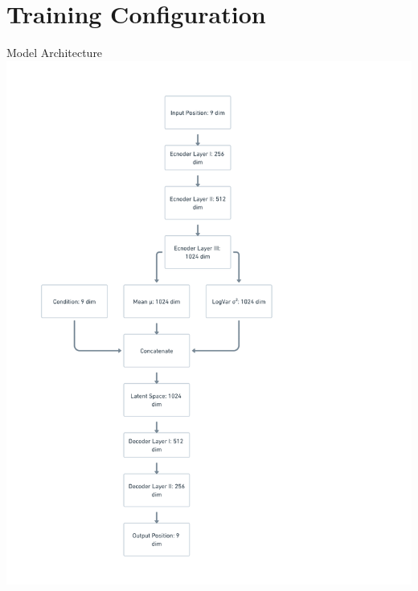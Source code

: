 \documentclass{beamer}
\begin{document}
\section{Training Configuration}


\begin{frame}{Model Architecture}
    \centering
    \includegraphics[height=0.9\textheight]{ma.png}
\end{frame}
\end{document}
